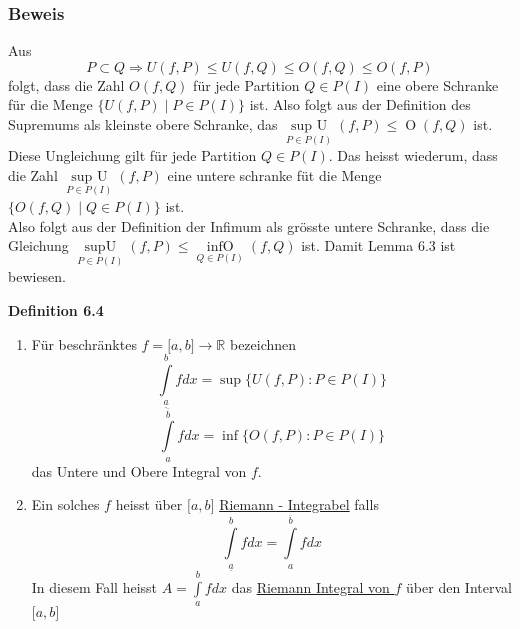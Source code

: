 \subsubsection*{Beweis}
Aus $$P\subset Q \Rightarrow U(f,P) \leq U(f,Q) \leq O(f,Q) \leq O(f,P)$$ folgt, dass die Zahl $O(f,Q)$ für jede Partition $Q\in P(I)$ eine obere Schranke für die Menge $\{ U(f,P)\mid P\in P(I)\}$ ist. Also folgt aus der Definition des Supremums als kleinste obere Schranke, das $\mathop {\sup {\text{ }}U}\limits_{P \in P(I)} (f,P) \le \mathop O(f,Q)$ ist. \\
\newpage
Diese Ungleichung gilt für jede Partition $Q\in P(I)$. Das heisst wiederum, dass die Zahl $\mathop {\sup {\text{ }}U}\limits_{P \in P(I)} (f,P)$ eine untere schranke füt die Menge $\{ O(f,Q)\mid Q \in P(I)\} $ ist.\\

Also folgt aus der Definition der Infimum als grösste untere Schranke, dass die Gleichung $\mathop {\sup U}\limits_{P \in P(I)} (f,P) \le \mathop {\inf O}\limits_{Q \in P(I)} (f,Q)$ ist. Damit Lemma 6.3 ist bewiesen.
\begin{framed}
\centerline{\textbf{Definition 6.4}}
\begin{enumerate}[\indent 1)]
\item Für beschränktes $f=\lbrack a,b \rbrack\rightarrow \mathbb{R}$ bezeichnen 
$$\int\limits_{\underline{a}}^b {fdx = \sup \{ U(f,P):P \in P(I)\} }$$
$$\int\limits_{a}^{\overline{b}} {fdx = \inf \{ O(f,P):P \in P(I)\} }$$
das Untere und Obere Integral von $f$.
\item Ein solches $f$ heisst über $\lbrack a,b\rbrack$ \underline{Riemann - Integrabel} falls $$\int\limits_{\underline{a}}^b {fdx}  = \int\limits_a^{\overline{b}} {fdx} $$ In diesem Fall heisst $A = \int\limits_a^b {fdx} $ das \underline{Riemann Integral von $f$} über den Interval $\lbrack a,b\rbrack$
\end{enumerate}
\end{framed}

